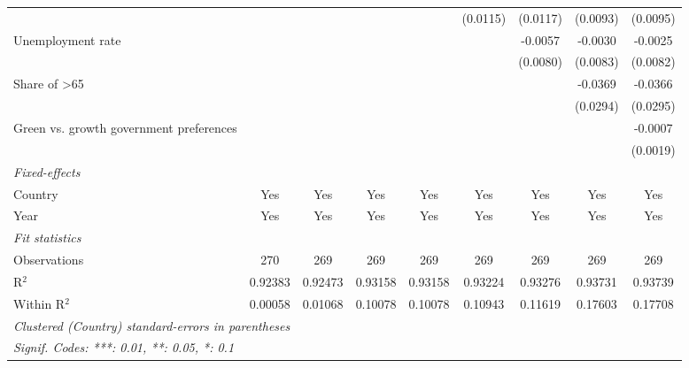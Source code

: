 \begin{table}[htbp]
\begin{tabular}{lcccccccc}
                                                      &          &          &                 &                 & (0.0115)        & (0.0117)        & (0.0093)        & (0.0095)\\   
      Unemployment rate                               &          &          &                 &                 &                 & -0.0057         & -0.0030         & -0.0025\\   
                                                      &          &          &                 &                 &                 & (0.0080)        & (0.0083)        & (0.0082)\\   
      Share of >65                                    &          &          &                 &                 &                 &                 & -0.0369         & -0.0366\\   
                                                      &          &          &                 &                 &                 &                 & (0.0294)        & (0.0295)\\   
      Green vs. growth government preferences         &          &          &                 &                 &                 &                 &                 & -0.0007\\   
                                                      &          &          &                 &                 &                 &                 &                 & (0.0019)\\   
      \midrule
      \emph{Fixed-effects}\\
      Country                                         & Yes      & Yes      & Yes             & Yes             & Yes             & Yes             & Yes             & Yes\\  
      Year                                            & Yes      & Yes      & Yes             & Yes             & Yes             & Yes             & Yes             & Yes\\  
      \midrule
      \emph{Fit statistics}\\
      Observations                                    & 270      & 269      & 269             & 269             & 269             & 269             & 269             & 269\\  
      R$^2$                                           & 0.92383  & 0.92473  & 0.93158         & 0.93158         & 0.93224         & 0.93276         & 0.93731         & 0.93739\\  
      Within R$^2$                                    & 0.00058  & 0.01068  & 0.10078         & 0.10078         & 0.10943         & 0.11619         & 0.17603         & 0.17708\\  
      \midrule \midrule
      \multicolumn{9}{l}{\emph{Clustered (Country) standard-errors in parentheses}}\\
      \multicolumn{9}{l}{\emph{Signif. Codes: ***: 0.01, **: 0.05, *: 0.1}}\\
   \end{tabular}
\end{table}


